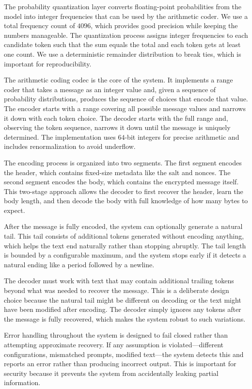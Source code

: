 \documentclass[sigconf,review,anonymous]{acmart}
\begin{document}
{The probability quantization layer converts floating-point probabilities from the model into integer frequencies that can be used by the arithmetic coder. We use a total frequency count of $4096$, which provides good precision while keeping the numbers manageable. The quantization process assigns integer frequencies to each candidate token such that the sum equals the total and each token gets at least one count. We use a deterministic remainder distribution to break ties, which is important for reproducibility.

The arithmetic coding codec is the core of the system. It implements a range coder that takes a message as an integer value and, given a sequence of probability distributions, produces the sequence of choices that encode that value. The encoder starts with a range covering all possible message values and narrows it down with each token choice. The decoder starts with the full range and, observing the token sequence, narrows it down until the message is uniquely determined. The implementation uses $64$-bit integers for precise arithmetic and includes renormalization to avoid underflow.

The encoding process is organized into two segments. The first segment encodes the header, which contains fixed-size metadata like the salt and nonces. The second segment encodes the body, which contains the encrypted message itself. This two-stage approach allows the decoder to first recover the header, learn the body length, and then decode the body with full knowledge of how many bytes to expect.

After the message is fully encoded, the system can optionally generate a natural tail. This tail consists of additional tokens generated without encoding anything, which helps the text end naturally rather than stopping abruptly. The tail length is bounded by a configurable maximum, and the system stops early if it detects a natural ending like a period followed by a newline.

The decoder must work with text that may contain additional trailing tokens beyond what was needed to recover the message. This is a deliberate design choice because the natural tail might be different on decoding or the text might have been modified after encoding. The decoder simply ignores any tokens after the message is fully recovered, which makes the system robust to such variations.

Error handling throughout the system is designed to fail closed rather than attempting approximate recovery. If any assumption is violated---different configurations, mismatched prompts, modified text---the system detects this and reports an error rather than producing incorrect output. This is important for security because it prevents the system from accidentally leaking partial information.

}
\end{document}
